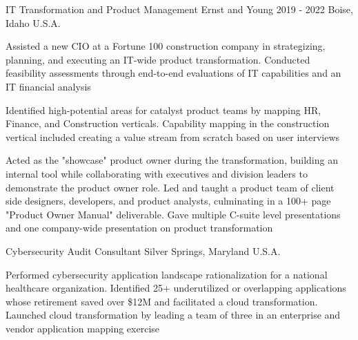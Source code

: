 \begin{cventries}
  \cventry
    {IT Transformation and Product Management} %
    {Ernst and Young} %
    {2019 - 2022} %
    {Boise, Idaho U.S.A.} %
    {
      \begin{cvitems} %
        \item {Assisted a new CIO at a Fortune 100 construction company in strategizing, planning, and executing an IT-wide product transformation. Conducted feasibility assessments through end-to-end evaluations of IT capabilities and an IT financial analysis}
        \item {Identified high-potential areas for catalyst product teams by mapping HR, Finance, and Construction verticals. Capability mapping in the construction vertical included creating a value stream from scratch based on user interviews}
        \item {Acted as the "showcase" product owner during the transformation, building an internal tool while collaborating with executives and division leaders to demonstrate the product owner role. Led and taught a product team of client side designers, developers, and product analysts, culminating in a 100+ page "Product Owner Manual" deliverable. Gave multiple C-suite level presentations and one company-wide presentation on product transformation}
      \end{cvitems}
    }

  \cventry
    {Cybersecurity Audit Consultant} %
    {} %
    {} %
    {Silver Springs, Maryland U.S.A.} %
    {
      \begin{cvitems} %
        \item {Performed cybersecurity application landscape rationalization for a national healthcare organization. Identified 25+ underutilized or overlapping applications whose retirement saved over \$12M and facilitated a cloud transformation. Launched cloud transformation by leading a team of three in an enterprise and vendor application mapping exercise}
      \end{cvitems}
    }


\end{cventries}
